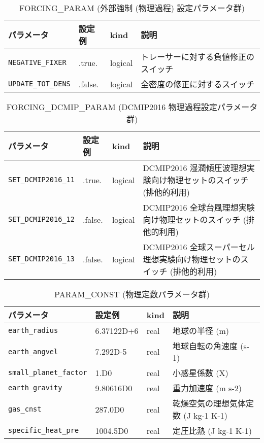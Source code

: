 \begin{table}[htb]
\begin{center}
\caption{FORCING\_PARAM (外部強制 (物理過程) 設定パラメータ群)}
\begin{tabularx}{150mm}{|l|l|l|X|} \hline
 \rowcolor[gray]{0.9} パラメータ & 設定例 & kind & 説明          \\ \hline
 \verb|NEGATIVE_FIXER|  & .true.  & logical & トレーサーに対する負値修正のスイッチ \\ \hline
 \verb|UPDATE_TOT_DENS| & .false. & logical & 全密度の修正に対するスイッチ \\ \hline
\end{tabularx}
\end{center}
\end{table}

\begin{table}[htb]
\begin{center}
\caption{FORCING\_DCMIP\_PARAM (DCMIP2016 物理過程設定パラメータ群)}
\begin{tabularx}{150mm}{|l|l|l|X|} \hline
 \rowcolor[gray]{0.9} パラメータ & 設定例 & kind & 説明          \\ \hline
 \verb|SET_DCMIP2016_11| & .true.  & logical & DCMIP2016 湿潤傾圧波理想実験向け物理セットのスイッチ (排他的利用) \\ \hline
 \verb|SET_DCMIP2016_12| & .false. & logical & DCMIP2016 全球台風理想実験向け物理セットのスイッチ (排他的利用) \\ \hline
 \verb|SET_DCMIP2016_13| & .false. & logical & DCMIP2016 全球スーパーセル理想実験向け物理セットのスイッチ (排他的利用) \\ \hline
\end{tabularx}
\end{center}
\end{table}

\begin{table}[htb]
\begin{center}
\caption{PARAM\_CONST (物理定数パラメータ群)}
\begin{tabularx}{150mm}{|l|l|l|X|} \hline
 \rowcolor[gray]{0.9} パラメータ & 設定例 & kind & 説明          \\ \hline
 \verb|earth_radius| & 6.37122D+6  & real & 地球の半径 (m) \\ \hline
 \verb|earth_angvel| & 7.292D-5    & real & 地球自転の角速度 (s-1) \\ \hline
 \verb|small_planet_factor| & 1.D0 & real & 小惑星係数 (X) \\ \hline
 \verb|earth_gravity|       & 9.80616D0 & real & 重力加速度 (m s-2) \\ \hline
 \verb|gas_cnst|            & 287.0D0   & real & 乾燥空気の理想気体定数 (J kg-1 K-1) \\ \hline
 \verb|specific_heat_pre|   & 1004.5D0  & real & 定圧比熱 (J kg-1 K-1) \\ \hline
\end{tabularx}
\end{center}
\end{table}

